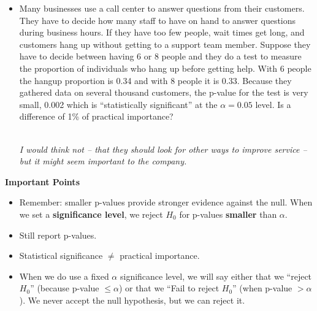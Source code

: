 \begin{itemize}
\begin{itemize}
     site.  Suppose they test two  web page designs (assigned at random) on 
     large groups of randomly selected viewers and find that there is
     a ``significant'' difference in mean time spent on their site
     (between the two designs) of 0.56 seconds ($\alpha$ was set to
     0.05). Is that an {\bf important}  difference?
\begin{key}
       \\ {\it It might be if it convinces advertisers to invest more
         in YouTube ads}.
\end{key}
   \item  Many businesses use a call center to answer questions from
     their customers.  They have to decide how many staff to have on
     hand to answer questions during business hours.  If they have too
     few people, wait times get long, and customers hang up without
     getting to a support team member. Suppose they have
     to decide between having 6 or 8 people and they do a test to
     measure the proportion of individuals who hang up before getting
     help. With 6 people the hangup proportion is 0.34 and with 8
     people it is 0.33.  Because they gathered data on several
     thousand customers, the p-value for the test is very small,
     0.002 which is ``statistically significant'' at the $\alpha =
     0.05$ level. Is a difference of 1\% of practical importance?
\begin{key}
       \\ {\it I would think not -- that they should look for other
         ways to improve service -- but it might seem important to the company.}
\end{key}
 
   \end{itemize}\vfill
 \end{itemize}



{\bf Important Points}
\begin{itemize}
\item Remember: smaller p-values provide stronger evidence against the
  null.  When we set a {\bf significance level}, we reject $H_0$ for
  p-values {\bf smaller} than $\alpha$.
\item Still report p-values.
\item Statistical significance $\neq$ practical importance.
\item When we do use a fixed $\alpha$ significance level, we will say
  either that we ``reject $H_0$'' (because p-value  $ \leq \alpha$) or
  that we ``Fail to reject $H_0$'' (when p-value $> \alpha$). We never
  accept the null hypothesis, but we can reject it.  
\end{itemize}
